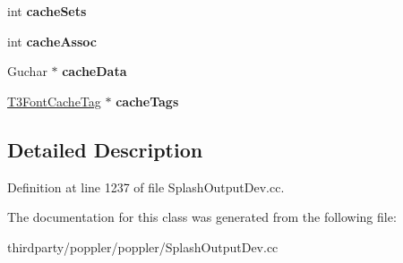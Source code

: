 \begin{DoxyCompactItemize}
\mbox{\label{class_t3_font_cache_ad9f11fdcc99cc8329de26382f175be30}} 
int {\bfseries cache\+Sets}
\item 
\mbox{\label{class_t3_font_cache_a2bd0f799ed6c957a2146e8e7d5430269}} 
int {\bfseries cache\+Assoc}
\item 
\mbox{\label{class_t3_font_cache_aa89b552be99ef8e332ae9b6f54834c6c}} 
Guchar $\ast$ {\bfseries cache\+Data}
\item 
\mbox{\label{class_t3_font_cache_a5954494b425c6d203cc332a2d6db2464}} 
\hyperlink{struct_t3_font_cache_tag}{T3\+Font\+Cache\+Tag} $\ast$ {\bfseries cache\+Tags}
\end{DoxyCompactItemize}


\subsection{Detailed Description}


Definition at line 1237 of file Splash\+Output\+Dev.\+cc.



The documentation for this class was generated from the following file\+:\begin{DoxyCompactItemize}
\item 
thirdparty/poppler/poppler/Splash\+Output\+Dev.\+cc\end{DoxyCompactItemize}
